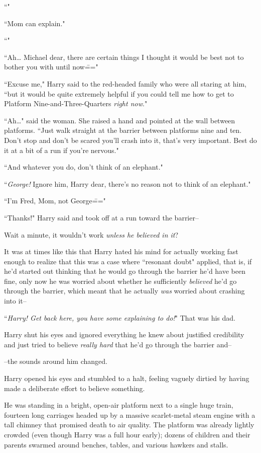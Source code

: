 ``"

``Mom can explain."

``"

``Ah{\ldots} Michael dear, there are certain things I thought it would be best not to bother you with until now\==="

``Excuse me," Harry said to the red-headed family who were all staring at him, ``but it would be quite extremely helpful if you could tell me how to get to Platform Nine-and-Three-Quarters \emph{right now}."

``Ah{\ldots}" said the woman. She raised a hand and pointed at the wall between platforms. ``Just walk straight at the barrier between platforms nine and ten. Don't stop and don't be scared you'll crash into it, that's very important. Best do it at a bit of a run if you're nervous."

``And whatever you do, don't think of an elephant."

``\emph{George!} Ignore him, Harry dear, there's no reason not to think of an elephant."

``I'm Fred, Mom, not George\==="

``Thanks!" Harry said and took off at a run toward the barrier\---

Wait a minute, it wouldn't work \emph{unless he believed in it}?

It was at times like this that Harry hated his mind for actually working fast enough to realize that this was a case where ``resonant doubt" applied, that is, if he'd started out thinking that he would go through the barrier he'd have been fine, only now he was worried about whether he sufficiently \emph{believed} he'd go through the barrier, which meant that he actually \emph{was} worried about crashing into it\---

``\emph{Harry! Get back here, you have some explaining to do!}" That was his dad.

Harry shut his eyes and ignored everything he knew about justified credibility and just tried to believe \emph{really hard} that he'd go through the barrier and\---

\---the sounds around him changed.

Harry opened his eyes and stumbled to a halt, feeling vaguely dirtied by having made a deliberate effort to believe something.

He was standing in a bright, open-air platform next to a single huge train, fourteen long carriages headed up by a massive scarlet-metal steam engine with a tall chimney that promised death to air quality. The platform was already lightly crowded (even though Harry was a full hour early); dozens of children and their parents swarmed around benches, tables, and various hawkers and stalls.

